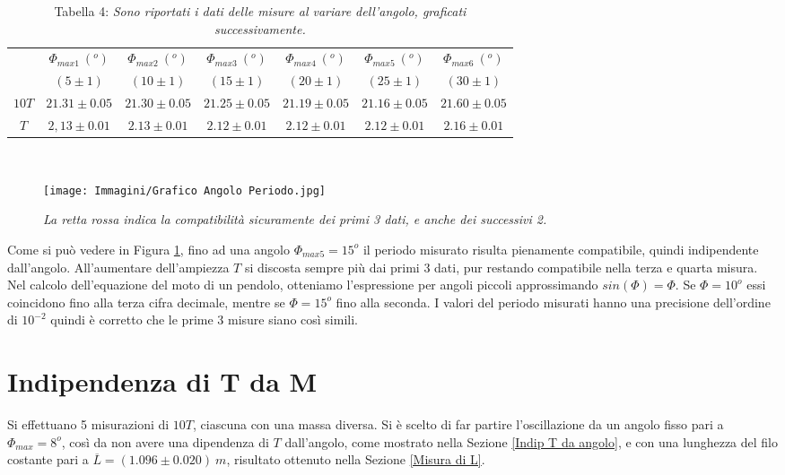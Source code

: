 \documentclass[12pt, a4paper]{article}
\begin{document}
\begin{table}[ht] 
\centering
\begin{tabular}{|c|c|c|c|c|c|c|} 
 \hline
    &$\Phi_{max1}\ (^o)$ & $\Phi_{max2}\ (^o)$ & $\Phi_{max3}\ (^o)$ & $\Phi_{max4}\  (^o)$ & $\Phi_{max5}\ (^o)$ & $\Phi_{max6}\ (^o)$  \\
    &$(5\pm1)$ & $(10\pm1)$ & $(15\pm1)$ & $(20\pm1)$ & $(25\pm1)$ & $(30\pm1)$  \\
\hline
    $10T$& $21.31\pm 0.05 $&$21.30\pm0.05$&$21.25\pm0.05$&$21.19\pm0.05$ &$21.16\pm0.05$&$21.60\pm 0.05$\\
\hline
    $T$& $2,13\pm 0.01 $&$2.13\pm0.01$&$2.12\pm0.01$&$2.12\pm0.01$ &$2.12\pm0.01$&$2.16\pm 0.01$\\
\hline
\end{tabular}\\



\caption*{\centering Tabella 4: \small{\textit{Sono riportati i dati delle misure al variare dell'angolo, graficati successivamente.}}}
    \label{tab T indip Angolo}
\end{table}





\begin{figure}[h!]
\centering
\texttt{[image: Immagini/Grafico Angolo Periodo.jpg]}
\caption{\textit{{\footnotesize{La retta rossa indica la compatibilità sicuramente dei primi 3 dati, e anche dei successivi 2. }}}}
\label{confrontoTT'}
\end{figure}

Come si può vedere in Figura \ref{confrontoTT'}, fino ad una angolo $\Phi_{max5}=15^o$ il periodo misurato risulta pienamente compatibile, quindi indipendente dall'angolo. All'aumentare dell'ampiezza $T$ si discosta sempre più dai primi 3 dati, pur restando compatibile nella terza e quarta misura.\\

Nel calcolo dell'equazione del moto di un pendolo, otteniamo l'espressione per angoli piccoli approssimando $sin(\Phi) = \Phi$. 
Se $\Phi = 10^o$ essi coincidono fino alla terza cifra decimale, mentre se $\Phi = 15^o$ fino alla seconda. 
I valori del periodo misurati hanno una precisione dell'ordine di $10^{-2}$ quindi è corretto che le prime 3 misure siano così simili. 






\newpage
\section{Indipendenza di T da M}
\label{Indip T da M}
Si effettuano 5 misurazioni di $10T$, ciascuna con una massa diversa. Si è scelto di far partire l'oscillazione da un angolo fisso pari a $\Phi_{max}=8^o$, così da non avere una dipendenza di $T$ dall'angolo, come mostrato nella Sezione \ref{Indip T da angolo}, e con una lunghezza del filo costante pari a $\overline{L}=(1.096\pm0.020)\ m$, risultato ottenuto nella Sezione \ref{Misura di L}.\\
\end{document}
